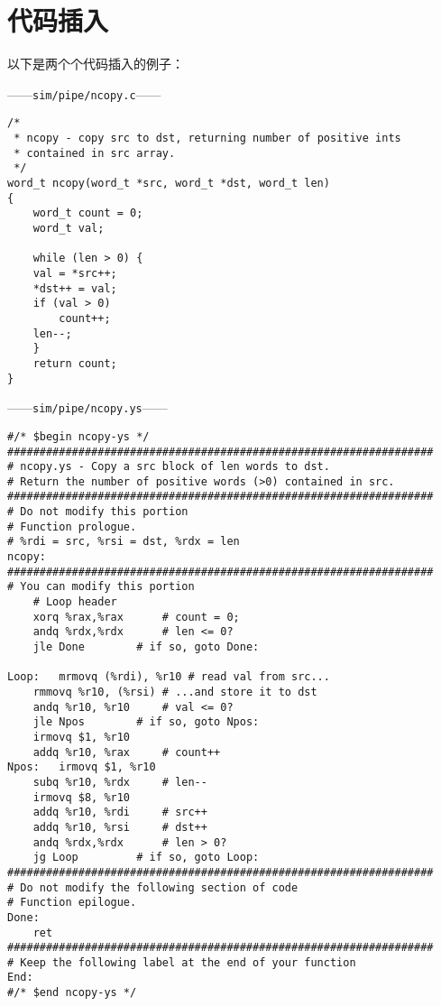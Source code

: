 \section{代码插入}
以下是两个个代码插入的例子：

\centerline{——\texttt{sim/pipe/ncopy.c}——}
\begin{lstlisting}
/*
 * ncopy - copy src to dst, returning number of positive ints
 * contained in src array.
 */
word_t ncopy(word_t *src, word_t *dst, word_t len)
{
    word_t count = 0;
    word_t val;

    while (len > 0) {
	val = *src++;
	*dst++ = val;
	if (val > 0)
	    count++;
	len--;
    }
    return count;
}
\end{lstlisting}

\centerline{——\texttt{sim/pipe/ncopy.ys}——}
\begin{lstlisting}
#/* $begin ncopy-ys */
##################################################################
# ncopy.ys - Copy a src block of len words to dst.
# Return the number of positive words (>0) contained in src.
##################################################################
# Do not modify this portion
# Function prologue.
# %rdi = src, %rsi = dst, %rdx = len
ncopy:
##################################################################
# You can modify this portion
	# Loop header
	xorq %rax,%rax		# count = 0;
	andq %rdx,%rdx		# len <= 0?
	jle Done		# if so, goto Done:

Loop:	mrmovq (%rdi), %r10	# read val from src...
	rmmovq %r10, (%rsi)	# ...and store it to dst
	andq %r10, %r10		# val <= 0?
	jle Npos		# if so, goto Npos:
	irmovq $1, %r10
	addq %r10, %rax		# count++
Npos:	irmovq $1, %r10
	subq %r10, %rdx		# len--
	irmovq $8, %r10
	addq %r10, %rdi		# src++
	addq %r10, %rsi		# dst++
	andq %rdx,%rdx		# len > 0?
	jg Loop			# if so, goto Loop:
##################################################################
# Do not modify the following section of code
# Function epilogue.
Done:
	ret
##################################################################
# Keep the following label at the end of your function
End:
#/* $end ncopy-ys */
\end{lstlisting}

